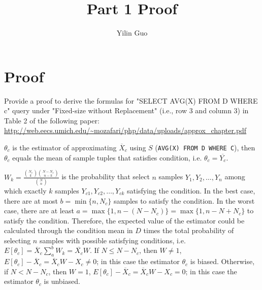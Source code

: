 \documentclass{article}
\author{Yilin Guo}
\title{Part 1 Proof}
\begin{document}
	\maketitle
	\section{Proof}
	 Provide a proof to derive the formulas for "SELECT AVG(X) FROM D WHERE c" query under "Fixed-size without Replacement" (i.e., row 3 and column 3) in Table 2 of the following paper: \url{http://web.eecs.umich.edu/~mozafari/php/data/uploads/approx_chapter.pdf}
	 
	 $\theta_c$ is the estimator of approximating $\overline{X}_c$ using $S$ (\texttt{AVG(X) FROM D WHERE C}), then $\theta_c$ equals the mean of sample tuples that satisfies condition, i.e. $\theta_c = \overline{Y_c}$.
	 
	 $W_k = \frac{\binom{N_c}{k}\binom{N - N_c}{n - k}}{\binom{N}{n}}$ is the probability that select $n$ samples $Y_1, Y_2, \dots, Y_n$ among which exactly $k$ samples $Y_{c1}, Y_{c2},\dots, Y_{ck}$ satisfying the condition. In the best case, there are at most $b = \min\{n, N_c\}$ samples to satisfy the condition. In the worst case, there are at least $a = \max\{1, n - (N - N_c)\} = \max\{1, n - N + N_c\}$ to satisfy the condition. Therefore, the expected value of the estimator could be calculated through the condition mean in $D$ times the total probability of selecting $n$ samples with possible satisfying conditions, i.e. $E[\theta_c] = \overline{X}_c\sum_{a}^{b}W_k = \overline{X_c}W$. If $N \leq N - N_c$, then $W \neq 1$, $E[\theta_c] - \overline{X}_c = \overline{X}_cW - X_c \neq 0$; in this case the estimator $\theta_c$ is biased. Otherwise, if $N < N - N_c$, then $W = 1$, $E[\theta_c] - \overline{X}_c = \overline{X}_cW - X_c = 0$; in this case the estimator $\theta_c$ is unbiased.
	 
	 
	 
	 
\end{document}

